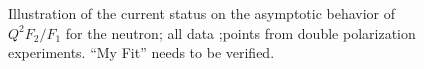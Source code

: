 \begin{figure}
\begin{center}
\caption{Illustration of the current status on the asymptotic behavior of $Q^2F_2/F_1$ for the neutron; all data ;points from double polarization experiments. ``My Fit'' needs to be verified.}
\label{fig:pf2f1p_asymp}
\end{center}
\end{figure}

